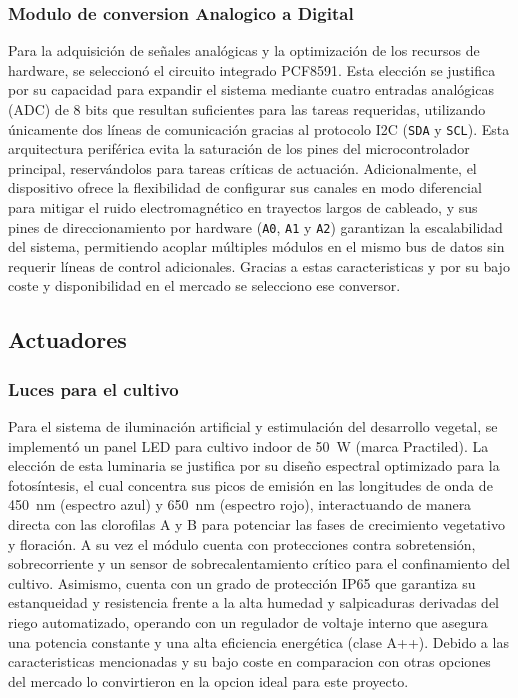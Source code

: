 \subsubsection{Modulo de conversion Analogico a Digital}
Para la adquisición de señales analógicas y la optimización de los recursos de hardware, se seleccionó el circuito integrado PCF8591. Esta elección se justifica por su capacidad para expandir el sistema mediante cuatro entradas analógicas (ADC) de 8 bits que resultan suficientes para las tareas requeridas, utilizando únicamente dos líneas de comunicación gracias al protocolo I2C (\texttt{SDA} y \texttt{SCL}). Esta arquitectura periférica evita la saturación de los pines del microcontrolador principal, reservándolos para tareas críticas de actuación. Adicionalmente, el dispositivo ofrece la flexibilidad de configurar sus canales en modo diferencial para mitigar el ruido electromagnético en trayectos largos de cableado, y sus pines de direccionamiento por hardware (\texttt{A0}, \texttt{A1} y \texttt{A2}) garantizan la escalabilidad del sistema, permitiendo acoplar múltiples módulos en el mismo bus de datos sin requerir líneas de control adicionales. 
Gracias a estas caracteristicas y por su bajo coste y disponibilidad en el mercado se selecciono ese conversor.

\subsection{Actuadores}

\subsubsection{Luces para el cultivo}
Para el sistema de iluminación artificial y estimulación del desarrollo vegetal, se implementó un panel LED para cultivo indoor de 50~W (marca Practiled). La elección de esta luminaria se justifica por su diseño espectral optimizado para la fotosíntesis, el cual concentra sus picos de emisión en las longitudes de onda de 450~nm (espectro azul) y 650~nm (espectro rojo), interactuando de manera directa con las clorofilas A y B para potenciar las fases de crecimiento vegetativo y floración. A su vez el módulo cuenta con protecciones contra sobretensión, sobrecorriente y un sensor de sobrecalentamiento crítico para el confinamiento del cultivo. Asimismo, cuenta con un grado de protección IP65 que garantiza su estanqueidad y resistencia frente a la alta humedad y salpicaduras derivadas del riego automatizado, operando con un regulador de voltaje interno que asegura una potencia constante y una alta eficiencia energética (clase A++). Debido a las caracteristicas mencionadas y su bajo coste en comparacion con otras opciones del mercado lo convirtieron en la opcion ideal para este proyecto.

